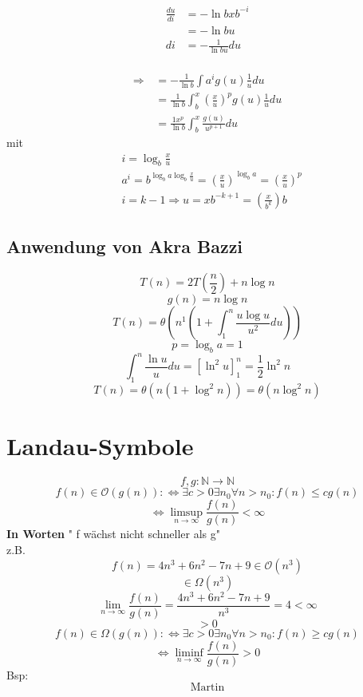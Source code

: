 \documentclass[a4paper,twoside,10pt]{report}
\begin{document}
{{{\begin{align*}
\frac{du}{di}&=-\ln b x b^{-i}\\&=-\ln b u\\
di&=-\frac{1}{\ln b u}du
\end{align*}
}}\\[.5em]
\begin{align*}
\Rightarrow\,&=-\frac{1}{\ln b}\int a^ig(u)\frac{1}{u}du\\
&=\frac{1}{\ln b}\int_b^x(\frac{x}{u})^pg(u)\frac{1}{u}du\\
&=\frac{1x^p}{\ln b}\int_b^x\frac{g(u)}{u^{p+1}}du
\end{align*}
mit
\begin{align*}
&i=\log_b\frac{x}{u}\\
&a^i=b^{\log_ba\log_b\frac{x}{u}}=(\frac{x}{u})^{\log_ba}=(\frac{x}{u})^p\\
&i=k-1\Rightarrow u=xb^{-k+1}=(\frac{x}{b^k})b
\end{align*}

\subsection{Anwendung von Akra Bazzi}
$$T(n)=2T(\frac{n}{2})+n\log n$$
$$g(n)=n\log n$$
$$T(n)=\theta (n^1(1+\int_1^n\frac{u\log u}{u^2}du))$$
$$p=\log_ba=1$$
$$\int_1^n\frac{\ln u}{u}du=[\ln^2u]_1^n=\frac{1}{2}\ln^2n$$
$$T(n)=\theta(n(1+\log^2n))=\theta(n\log^2n)$$

\section{Landau-Symbole}
$$f,g:\mathbb N \rightarrow\mathbb N$$
$$f(n)\in \mathcal O(g(n)):\Leftrightarrow\exists c>0\exists n_0\forall n>n_0:f(n)\leq cg(n)$$
$$\Leftrightarrow \limsup_{n\rightarrow\infty}\frac{f(n)}{g(n)}<\infty$$
\textbf{In Worten} " f wächst nicht schneller als g"\\
z.B. $$f(n)=4n^3+6n^2-7n+9\in\mathcal O(n^3)$$
$$\in \Omega(n^3)$$
$$\lim_{n\rightarrow \infty}\frac{f(n)}{g(n)}=\frac{4n^3+6n^2-7n+9}{n^3}=4<\infty$$
$$>0$$
$$f(n)\in\Omega(g(n)):\Leftrightarrow\exists c>0 \exists n_0 \forall n>n_0:f(n)\ge cg(n)$$
$$\Leftrightarrow \liminf_{n\rightarrow\infty}\frac{f(n)}{g(n)}>0$$
Bsp:
$$\mbox{Martin}$$





























}
\end{document}
